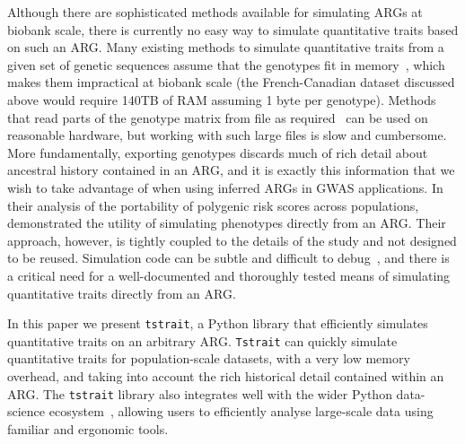 \documentclass[unnumsec,webpdf,modern,large,namedate]{oup-authoring-template}%
\begin{document}
Although there are sophisticated methods available for simulating
ARGs at biobank scale, there is currently no
easy way to simulate quantitative traits based on such an ARG.
Many existing methods to simulate quantitative traits from a given set of
genetic sequences assume that the genotypes fit in
memory~\citep[e.g.][]{meyer2018,fernandes2020}, which makes them
impractical at biobank scale (the French-Canadian dataset discussed
above would require 140TB of RAM assuming 1 byte per genotype).
Methods that read parts of the genotype matrix from file as
required~\citep[e.g.][]{wharrie2023hapnest} can be used on
reasonable hardware, but working with such large files is slow
and cumbersome.
More fundamentally, exporting genotypes discards much of rich
detail about ancestral history contained in an ARG, and
it is exactly this information that we wish to take
advantage of when using inferred ARGs in GWAS applications.
In their analysis of the portability of polygenic risk
scores across populations, \citet{martin2017}
demonstrated the utility of simulating phenotypes directly
from an ARG. Their approach, however, is tightly coupled to the details
of the study and not designed to be reused.
Simulation code can be subtle and difficult to
debug~\citep{ragsdale2020lessons}, and there
is a critical need for a well-documented and
thoroughly tested means of simulating quantitative
traits directly from an ARG.

In this paper we present \texttt{tstrait}, a Python library that
efficiently simulates quantitative traits on an arbitrary ARG.
\texttt{Tstrait} can
quickly simulate quantitative traits for population-scale datasets,
with a very low memory overhead, and taking into account
the rich historical detail contained within an ARG.
The \texttt{tstrait} library also integrates well with the wider
Python data-science ecosystem~\citep{numpy},
allowing users to efficiently analyse
large-scale data using familiar and ergonomic tools.
\end{document}
